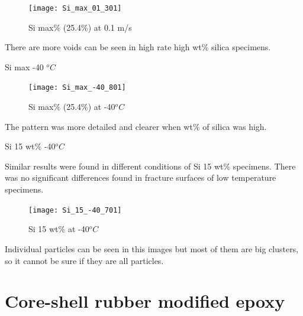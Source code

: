 \documentclass[numbers=noendperiod,chapterprefix=on]{icldt} %
\begin{document}
{\begin{figure}[!hp]
\centering
\texttt{[image: Si\_max\_01\_301]}
\caption{Si max\% (25.4\%) at 0.1 m/s} \label{Si_max_0.1_301}
\end{figure}
\FloatBarrier



There are more voids can be seen in high rate high wt\% silica specimens.

Si max -40 $^oC$

\begin{figure}[!hp]
\centering
\texttt{[image: Si\_max\_-40\_801]}
\caption{Si max\% (25.4\%) at -40$^oC$} \label{Si_max_-40_801}
\end{figure}
\FloatBarrier


The pattern was more detailed and clearer when wt\% of silica was high.

Si 15 wt\% -40$^oC$

Similar results were found in different conditions of Si 15 wt\% specimens. There was no significant differences found in fracture surfaces of low temperature specimens.

\begin{figure}[!hp]
\centering
\texttt{[image: Si\_15\_-40\_701]}
\caption{Si 15 wt\% at -40$^oC$} \label{Si_15_-40_701}
\end{figure}
\FloatBarrier

Individual particles can be seen in this images but most of them are big clusters, so it cannot be sure if they are all particles.
\section{Core-shell rubber modified epoxy}

}
\end{document}

